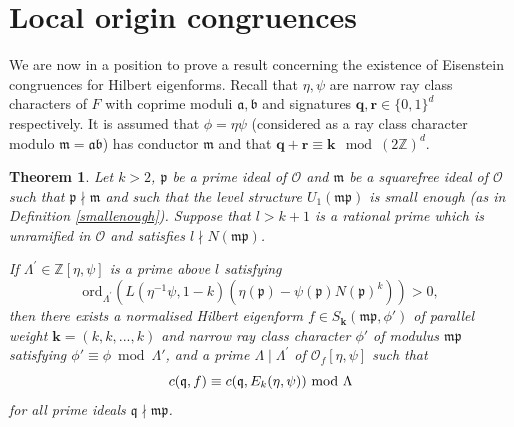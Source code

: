 \documentclass[a4paper,oneside]{amsart}
\theoremstyle{plain}
\newtheorem{thm}{Theorem}[section]
\theoremstyle{definition}
\begin{document}
\section{Local origin congruences}
We are now in a position to prove a result concerning the existence of Eisenstein congruences for Hilbert eigenforms. Recall that $\eta,\psi$ are narrow ray class characters of $F$ with coprime moduli $\mathfrak{a},\mathfrak{b}$ and signatures $\textbf{q},\textbf{r}\in\{0,1\}^d$ respectively. It is assumed that $\phi = \eta\psi$ (considered as a ray class character modulo $\mathfrak{m} = \mathfrak{a}\mathfrak{b}$) has conductor $\mathfrak{m}$ and that $\textbf{q}+\textbf{r} \equiv \textbf{k} \mod (2\mathbb{Z})^d$. 


\begin{thm}
\label{thm:existence}
Let $k>2$, $\mathfrak{p}$ be a prime ideal of $\mathcal{O}$ and $\mathfrak{m}$ be a squarefree ideal of $\mathcal{O}$ such that $\mathfrak{p} \nmid \mathfrak{m}$ and such that the level structure $U_1(\mathfrak{mp})$ is small enough (as in Definition \ref{smallenough}). Suppose that $l > k+1$ is a rational prime which is unramified in $\mathcal{O}$ and satisfies $l\nmid N(\mathfrak{mp})$.

If $\Lambda^\prime \in \mathbb{Z}[\eta, \psi]$ is a prime above $l$ satisfying
\begin{equation*}
    \text{ord}_{\Lambda^\prime}(L(\eta^{-1}\psi, 1-k)(\eta(\mathfrak{p})-\psi(\mathfrak{p})N(\mathfrak{p})^k)) > 0,
\end{equation*}
then there exists a normalised Hilbert eigenform $f \in S_{\textbf{k}}(\mathfrak{mp},\phi')$ of parallel weight $\textbf{k} = (k,k,...,k)$ and narrow ray class character $\phi'$ of modulus $\mathfrak{mp}$ satisfying $\phi'\equiv \phi \bmod \Lambda'$, and a prime $\Lambda \mid \Lambda^\prime$ of $\mathcal{O}_f[\eta, \psi]$ such that
\begin{equation*}
    c(\mathfrak{q},f) \equiv c(\mathfrak{q},E_k(\eta, \psi)) \ \textnormal{mod } \Lambda
\end{equation*} for all prime ideals $\mathfrak{q} \nmid \mathfrak{mp}$.
\end{thm}
\end{document}
